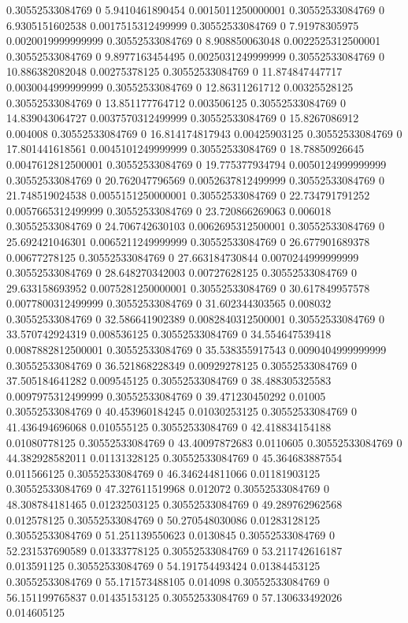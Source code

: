 0.30552533084769 0 5.9410461890454 0.0015011250000001
0.30552533084769 0 6.9305151602538 0.0017515312499999
0.30552533084769 0 7.91978305975 0.0020019999999999
0.30552533084769 0 8.908850063048 0.0022525312500001
0.30552533084769 0 9.8977163454495 0.0025031249999999
0.30552533084769 0 10.886382082048 0.00275378125
0.30552533084769 0 11.874847447717 0.0030044999999999
0.30552533084769 0 12.86311261712 0.00325528125
0.30552533084769 0 13.851177764712 0.003506125
0.30552533084769 0 14.839043064727 0.0037570312499999
0.30552533084769 0 15.8267086912 0.004008
0.30552533084769 0 16.814174817943 0.00425903125
0.30552533084769 0 17.801441618561 0.0045101249999999
0.30552533084769 0 18.78850926645 0.0047612812500001
0.30552533084769 0 19.775377934794 0.0050124999999999
0.30552533084769 0 20.762047796569 0.0052637812499999
0.30552533084769 0 21.748519024538 0.0055151250000001
0.30552533084769 0 22.734791791252 0.0057665312499999
0.30552533084769 0 23.720866269063 0.006018
0.30552533084769 0 24.706742630103 0.0062695312500001
0.30552533084769 0 25.692421046301 0.0065211249999999
0.30552533084769 0 26.677901689378 0.00677278125
0.30552533084769 0 27.663184730844 0.0070244999999999
0.30552533084769 0 28.648270342003 0.00727628125
0.30552533084769 0 29.633158693952 0.0075281250000001
0.30552533084769 0 30.617849957578 0.0077800312499999
0.30552533084769 0 31.602344303565 0.008032
0.30552533084769 0 32.586641902389 0.0082840312500001
0.30552533084769 0 33.570742924319 0.008536125
0.30552533084769 0 34.554647539418 0.0087882812500001
0.30552533084769 0 35.538355917543 0.0090404999999999
0.30552533084769 0 36.521868228349 0.00929278125
0.30552533084769 0 37.505184641282 0.009545125
0.30552533084769 0 38.488305325583 0.0097975312499999
0.30552533084769 0 39.471230450292 0.01005
0.30552533084769 0 40.453960184245 0.01030253125
0.30552533084769 0 41.436494696068 0.010555125
0.30552533084769 0 42.418834154188 0.01080778125
0.30552533084769 0 43.40097872683 0.0110605
0.30552533084769 0 44.382928582011 0.01131328125
0.30552533084769 0 45.364683887554 0.011566125
0.30552533084769 0 46.346244811066 0.01181903125
0.30552533084769 0 47.327611519968 0.012072
0.30552533084769 0 48.308784181465 0.01232503125
0.30552533084769 0 49.289762962568 0.012578125
0.30552533084769 0 50.270548030086 0.01283128125
0.30552533084769 0 51.251139550623 0.0130845
0.30552533084769 0 52.231537690589 0.01333778125
0.30552533084769 0 53.211742616187 0.013591125
0.30552533084769 0 54.191754493424 0.01384453125
0.30552533084769 0 55.171573488105 0.014098
0.30552533084769 0 56.151199765837 0.01435153125
0.30552533084769 0 57.130633492026 0.014605125
